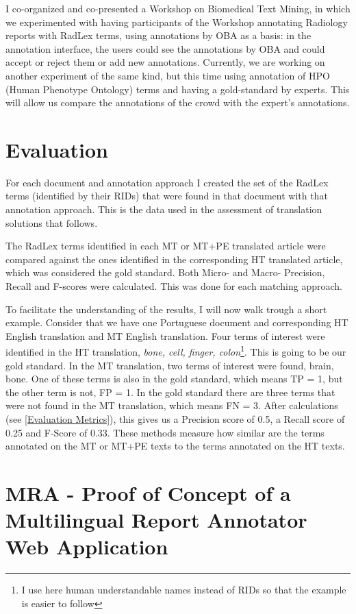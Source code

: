 I co-organized and co-presented a Workshop on Biomedical Text Mining, in which we experimented with having participants of the Workshop annotating Radiology reports with RadLex terms, using annotations by OBA as a basis: in the annotation interface, the users could see the annotations by OBA and could accept or reject them or add new annotations. Currently, we are working on another experiment of the same kind, but this time using annotation of HPO (Human Phenotype Ontology) terms and having a gold-standard by experts. This will allow us compare the annotations of the crowd with the expert's annotations.


\section{Evaluation}

For each document and annotation approach I created the set of the RadLex terms (identified by their RIDs) that were found in that document with that annotation approach. This is the data used in the assessment of translation solutions that follows.

The RadLex terms identified in each MT or MT+PE translated article were compared against the ones identified in the corresponding HT translated article, which was considered the gold standard. Both Micro- and Macro- Precision, Recall and F-scores were calculated. This was done for each matching approach. 

To facilitate the understanding of the results, I will now walk trough a short example. Consider that we have one Portuguese document and corresponding HT English translation and MT English translation. Four terms of interest were identified in the HT translation, \emph{bone, cell, finger, colon}\footnote{I use here human understandable names instead of RIDs so that the example is easier to follow}. This is going to be our gold standard. In the MT translation, two terms of interest were found, {brain, bone}. One of these terms is also in the gold standard, which means TP = 1, but the other term is not, FP = 1. In the gold standard there are three terms that were not found in the MT translation, which means FN = 3. After calculations (see \ref{Evaluation Metrics}), this gives us a Precision score of 0.5, a Recall score of 0.25 and F-Score of 0.33. These methods measure how similar are the terms annotated on the MT or MT+PE texts to the terms annotated on the HT texts.


\section{MRA - Proof of Concept of a Multilingual Report Annotator Web Application}

